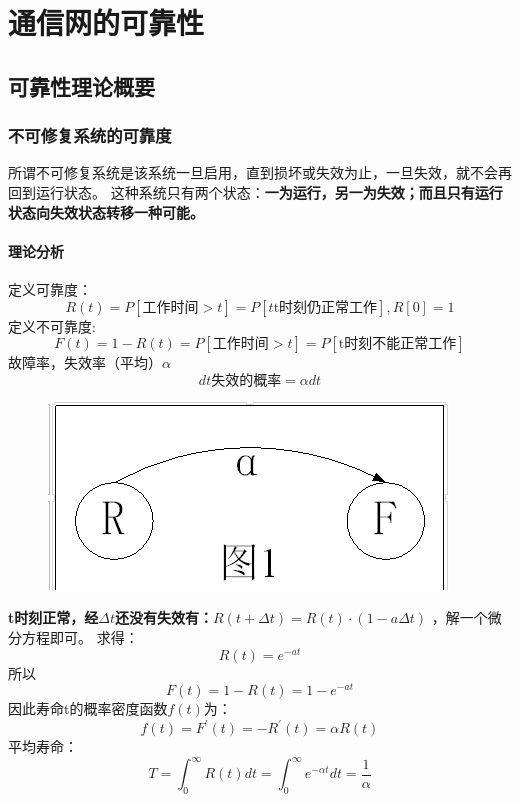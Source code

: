 \chapter{通信网的可靠性}
\section{可靠性理论概要
}
\subsection{不可修复系统的可靠度
}
所谓不可修复系统是该系统一旦启用，直到损坏或失效为止，一旦失效，就不会再回到运行状态。
这种系统只有两个状态：\textbf{一为运行，另一为失效；而且只有运行状态向失效状态转移一种可能。}\\
\subsubsection{理论分析}
定义可靠度：
\begin{equation}\label{key}
R(t) = P[\text{工作时间}>t] = P[t\text{t时刻仍正常工作}],R[0] = 1
\end{equation}
定义不可靠度:
\begin{equation}\label{key}
F(t) = 1 - R(t) =P[\text{工作时间}>t] =  P[\text{t时刻不能正常工作}]
\end{equation}
故障率，失效率（平均）$ \alpha $
\begin{equation}\label{key}
dt\text{失效的概率} = \alpha dt
\end{equation}
\begin{figure}[H]
	\centering
	\includegraphics[width=0.7\linewidth]{figures/screenshot085}
	\caption{}
	\label{fig:screenshot085}
\end{figure}

\textbf{t时刻正常，经$ \Delta t $还没有失效有：$ R(t+\Delta t)=R(t) ·(1-a\Delta t) $
}，解一个微分方程即可。
求得：
\begin{equation}\label{key}
R(t) = e^{-at}
\end{equation}
所以
\begin{equation}\label{key}
F(t) = 1-R(t) = 1-e^{-at}
\end{equation}
因此寿命t的概率密度函数$ f(t) $为：
\begin{equation}\label{key}
f(t) = F^{'}(t) = -R^{'}(t) = \alpha R(t)
\end{equation}
平均寿命：
\begin{equation}\label{key}
T  = \int_{0}^{\infty} R(t) dt = \int_{0}^{\infty} e^{-\alpha t} dt = \frac{1}{\alpha}
\end{equation}


